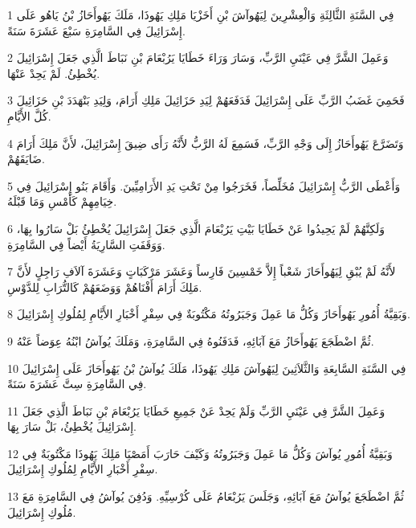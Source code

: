 \par 1 فِي السَّنَةِ الثَّالِثَةِ وَالْعِشْرِينَ لِيَهُوآشَ بْنِ أَخَزْيَا مَلِكِ يَهُوذَا، مَلَكَ يَهُوأَحَازُ بْنُ يَاهُو عَلَى إِسْرَائِيلَ فِي السَّامِرَةِ سَبْعَ عَشَرَةَ سَنَةً.
\par 2 وَعَمِلَ الشَّرَّ فِي عَيْنَيِ الرَّبِّ، وَسَارَ وَرَاءَ خَطَايَا يَرُبْعَامَ بْنِ نَبَاطَ الَّذِي جَعَلَ إِسْرَائِيلَ يُخْطِئُ. لَمْ يَحِدْ عَنْهَا.
\par 3 فَحَمِيَ غَضَبُ الرَّبِّ عَلَى إِسْرَائِيلَ فَدَفَعَهُمْ لِيَدِ حَزَائِيلَ مَلِكِ أَرَامَ، وَلِيَدِ بَنْهَدَدَ بْنِ حَزَائِيلَ كُلَّ الأَيَّامِ.
\par 4 وَتَضَرَّعَ يَهُوأَحَازُ إِلَى وَجْهِ الرَّبِّ، فَسَمِعَ لَهُ الرَّبُّ لأَنَّهُ رَأَى ضِيقَ إِسْرَائِيلَ، لأَنَّ مَلِكَ أَرَامَ ضَايَقَهُمْ.
\par 5 وَأَعْطَى الرَّبُّ إِسْرَائِيلَ مُخَلِّصاً، فَخَرَجُوا مِنْ تَحْتِ يَدِ الأَرَامِيِّينَ. وَأَقَامَ بَنُو إِسْرَائِيلَ فِي خِيَامِهِمْ كَأَمْسِ وَمَا قَبْلَهُ.
\par 6 وَلَكِنَّهُمْ لَمْ يَحِيدُوا عَنْ خَطَايَا بَيْتِ يَرُبْعَامَ الَّذِي جَعَلَ إِسْرَائِيلَ يُخْطِئُ بَلْ سَارُوا بِهَا، وَوَقَفَتِ السَّارِيَةُ أَيْضاً فِي السَّامِرَةِ.
\par 7 لأَنَّهُ لَمْ يُبْقِ لِيَهُوأَحَازَ شَعْباً إِلاَّ خَمْسِينَ فَارِساً وَعَشَرَ مَرْكَبَاتٍ وَعَشَرَةَ آلاَفِ رَاجِلٍ لأَنَّ مَلِكَ أَرَامَ أَفْنَاهُمْ وَوَضَعَهُمْ كَالتُّرَابِ لِلدَّوْسِ.
\par 8 وَبَقِيَّةُ أُمُورِ يَهُوأَحَازَ وَكُلُّ مَا عَمِلَ وَجَبَرُوتُهُ مَكْتُوبَةٌ فِي سِفْرِ أَخْبَارِ الأَيَّامِ لِمُلُوكِ إِسْرَائِيلَ.
\par 9 ثُمَّ اضْطَجَعَ يَهُوأَحَازُ مَعَ آبَائِهِ، فَدَفَنُوهُ فِي السَّامِرَةِ، وَمَلَكَ يُوآشُ ابْنُهُ عِوَضاً عَنْهُ.
\par 10 فِي السَّنَةِ السَّابِعَةِ وَالثَّلاَثِينَ لِيَهُوآشَ مَلِكِ يَهُوذَا، مَلَكَ يُوآشُ بْنُ يَهُوأَحَازَ عَلَى إِسْرَائِيلَ فِي السَّامِرَةِ سِتَّ عَشَرَةَ سَنَةً.
\par 11 وَعَمِلَ الشَّرَّ فِي عَيْنَيِ الرَّبِّ وَلَمْ يَحِدْ عَنْ جَمِيعِ خَطَايَا يَرُبْعَامَ بْنِ نَبَاطَ الَّذِي جَعَلَ إِسْرَائِيلَ يُخْطِئُ، بَلْ سَارَ بِهَا.
\par 12 وَبَقِيَّةُ أُمُورِ يُوآشَ وَكُلُّ مَا عَمِلَ وَجَبَرُوتُهُ وَكَيْفَ حَارَبَ أَمَصْيَا مَلِكَ يَهُوذَا مَكْتُوبَةٌ فِي سِفْرِ أَخْبَارِ الأَيَّامِ لِمُلُوكِ إِسْرَائِيلَ.
\par 13 ثُمَّ اضْطَجَعَ يُوآشُ مَعَ آبَائِهِ، وَجَلَسَ يَرُبْعَامُ عَلَى كُرْسِيِّهِ. وَدُفِنَ يُوآشُ فِي السَّامِرَةِ مَعَ مُلُوكِ إِسْرَائِيلَ.
